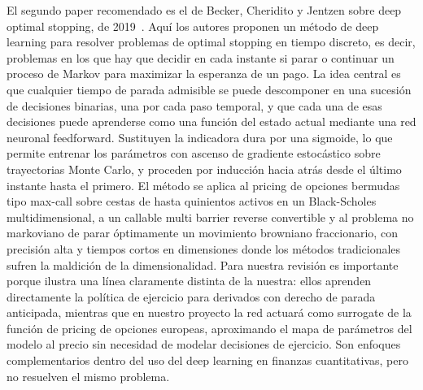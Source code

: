 \documentclass[11pt,a4paper]{article}
\begin{document}
El segundo paper recomendado es el de Becker, Cheridito y Jentzen sobre deep optimal stopping, de 2019~\cite{becker2019}. Aquí los autores proponen un método de deep learning para resolver problemas de optimal stopping en tiempo discreto, es decir, problemas en los que hay que decidir en cada instante si parar o continuar un proceso de Markov para maximizar la esperanza de un pago. La idea central es que cualquier tiempo de parada admisible se puede descomponer en una sucesión de decisiones binarias, una por cada paso temporal, y que cada una de esas decisiones puede aprenderse como una función del estado actual mediante una red neuronal feedforward. Sustituyen la indicadora dura por una sigmoide, lo que permite entrenar los parámetros con ascenso de gradiente estocástico sobre trayectorias Monte Carlo, y proceden por inducción hacia atrás desde el último instante hasta el primero. El método se aplica al pricing de opciones bermudas tipo max-call sobre cestas de hasta quinientos activos en un Black-Scholes multidimensional, a un callable multi barrier reverse convertible y al problema no markoviano de parar óptimamente un movimiento browniano fraccionario, con precisión alta y tiempos cortos en dimensiones donde los métodos tradicionales sufren la maldición de la dimensionalidad. Para nuestra revisión es importante porque ilustra una línea claramente distinta de la nuestra: ellos aprenden directamente la política de ejercicio para derivados con derecho de parada anticipada, mientras que en nuestro proyecto la red actuará como surrogate de la función de pricing de opciones europeas, aproximando el mapa de parámetros del modelo al precio sin necesidad de modelar decisiones de ejercicio. Son enfoques complementarios dentro del uso del deep learning en finanzas cuantitativas, pero no resuelven el mismo problema.
\end{document}
